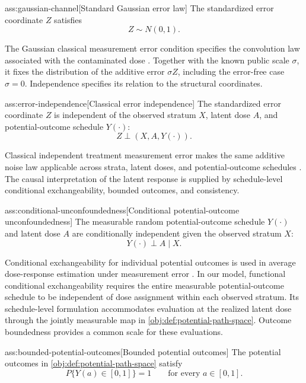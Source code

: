 \begin{assumptionv}{ass:gaussian-channel}[Standard Gaussian error law]
The standardized error coordinate \(Z\) satisfies
\[
Z\sim N(0,1).
\]
\end{assumptionv}

The Gaussian classical measurement error condition specifies the convolution law associated with the contaminated dose \citep{FanTruong1993}. Together with the known public scale \(\sigma\), it fixes the distribution of the additive error \(\sigma Z\), including the error-free case \(\sigma=0\). Independence specifies its relation to the structural coordinates.

\begin{assumptionv}{ass:error-independence}[Classical error independence]
The standardized error coordinate \(Z\) is independent of the observed stratum \(X\), latent dose \(A\), and potential-outcome schedule \(Y(\cdot)\):
\[
Z\perp(X,A,Y(\cdot)).
\]
\end{assumptionv}

Classical independent treatment measurement error makes the same additive noise law applicable across strata, latent doses, and potential-outcome schedules \citep{HuangZhang2023}. The causal interpretation of the latent response is supplied by schedule-level conditional exchangeability, bounded outcomes, and consistency.

\begin{assumptionv}{ass:conditional-unconfoundedness}[Conditional potential-outcome unconfoundedness]
The measurable random potential-outcome schedule \(Y(\cdot)\) and latent dose \(A\) are conditionally independent given the observed stratum \(X\):
\[
Y(\cdot)\perp A\mid X.
\]
\end{assumptionv}

Conditional exchangeability for individual potential outcomes is used in average dose-response estimation under measurement error \citep{HuangZhang2023}. In our model, functional conditional exchangeability requires the entire measurable potential-outcome schedule to be independent of dose assignment within each observed stratum. Its schedule-level formulation accommodates evaluation at the realized latent dose through the jointly measurable map in \cref{obj:def:potential-path-space}. Outcome boundedness provides a common scale for these evaluations.

\begin{assumptionv}{ass:bounded-potential-outcomes}[Bounded potential outcomes]
The potential outcomes in \cref{obj:def:potential-path-space} satisfy
\[
P\{Y(a)\in[0,1]\}=1
\qquad
\text{for every }a\in[0,1].
\]
\end{assumptionv}

